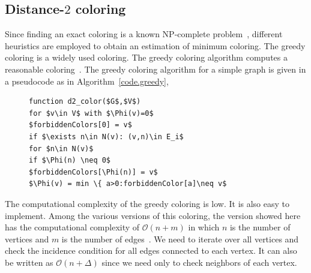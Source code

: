 \documentclass[12pt, twoside]{book}
\newcommand{\coderef}[1]{Algorithm~\protect\ref{#1}}
\begin{document}
\subsection{Distance-$2$ coloring}
Since finding an exact coloring is a known NP-complete problem~\cite{SPINRAD198589},
different heuristics are employed to obtain an estimation of minimum coloring. The greedy coloring is a widely used coloring. The greedy coloring algorithm computes a reasonable coloring~\cite{spaa14}.
The greedy coloring algorithm for a simple graph is given
in a pseudocode as in \coderef{code.greedy},
\begin{figure}
\begin{lstlisting}[caption=The greedy algorithm for the distance-$2$ coloring.,label=code.greedy,mathescape]
function d2_color($G$,$V$)
for $v\in V$ with $\Phi(v)=0$
$forbiddenColors[0] = v$
if $\exists n\in N(v): (v,n)\in E_i$
for $n\in N(v)$
if $\Phi(n) \neq 0$
$forbiddenColors[\Phi(n)] = v$
$\Phi(v) = min \{ a>0:forbiddenColor[a]\neq v$
\end{lstlisting}
\end{figure}
The computational complexity of the greedy coloring is low. It is
also easy to implement. Among the various versions of this coloring,
the version showed here has the computational complexity of
$\mathcal{O}(n + m)$ in which $n$ is the number of vertices
and $m$ is the number of edges~\cite{ordering1}.
We need to iterate over all vertices and check the incidence condition for all edges connected to each vertex. It can also be written as $\mathcal{O}(n + \Delta)$ since we need only to check neighbors of each vertex.
\end{document}

